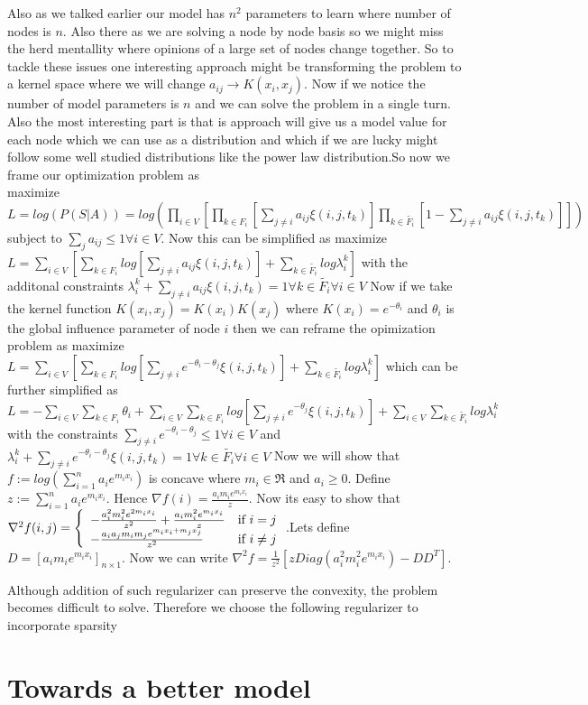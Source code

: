 Also as we talked earlier our model has $n^2$ parameters to learn where number of nodes is $n$. Also there as we are solving a node by node basis so we might miss the herd mentallity where opinions of a large set of nodes change together. So to tackle these issues one interesting approach might be transforming the problem to a kernel space where we will change $a_{ij} \rightarrow K(x_i,x_j)$. Now if we notice the number of model parameters is $n$ and we can solve the problem in a single turn. Also the most interesting part is that is approach will give us a model value for each node which we can use as a distribution and which if we are lucky might follow some well studied distributions like the power law distribution.So now we frame our optimization problem as \\
maximize $L = log(P(S|A)) = log(\displaystyle\prod_{i \in V}[\displaystyle\prod_{k \in F_i}[\displaystyle\sum_{j \neq i} a_{ij}\xi (i,j,t_k)]\displaystyle\prod_{k \in \widetilde{F_{i}}} [1-\displaystyle\sum_{j \neq i}a_{ij}\xi (i,j,t_k)]])$ subject to $\displaystyle\sum_{j} a_{ij} \leq 1 \forall i \in V$. 
Now this can be simplified as maximize $L = \displaystyle\sum_{i \in V}[\displaystyle\sum_{k \in F_i}log[\displaystyle\sum_{j \neq i} a_{ij}\xi (i,j,t_k)]+\displaystyle\sum_{k \in \widetilde{F_{i}}}log\lambda_{i}^{k}]$ with the additonal constraints $\lambda_{i}^{k} + \displaystyle\sum_{j \neq i}a_{ij}\xi (i,j,t_k) = 1 \forall k \in \widetilde{F_{i}} \forall i \in V$
Now if we take the kernel function $K(x_i,x_j) = K(x_i)K(x_j)$ where $K(x_i) = e^{-\theta_i}$ and $\theta_i$ is the global influence parameter of node $i$ then we can reframe the opimization problem as maximize $L = \displaystyle\sum_{i \in V}[\displaystyle\sum_{k \in F_i}log[\displaystyle\sum_{j \neq i} e^{-\theta_i-\theta_j}\xi (i,j,t_k)]+\displaystyle\sum_{k \in \widetilde{F_{i}}}log\lambda_{i}^{k}]$ which can be further simplified as $L = -\displaystyle\sum_{i \in V}\displaystyle\sum_{k \in F_i}\theta_i+\displaystyle\sum_{i \in V}\displaystyle\sum_{k \in F_i}log[\displaystyle\sum_{j \neq i} e^{-\theta_j}\xi (i,j,t_k)]+\displaystyle\sum_{i \in V}\displaystyle\sum_{k \in \widetilde{F_{i}}}log\lambda_{i}^{k}$ with the constraints $\displaystyle\sum_{j \neq i}e^{-\theta_i-\theta_j} \leq 1 \forall i \in V$ and $\lambda_{i}^{k} + \displaystyle\sum_{j \neq i}e^{-\theta_i-\theta_j}\xi(i,j,t_k) = 1 \forall k \in \widetilde{F_i} \forall i\in V$
Now we will show that $f := log(\displaystyle\sum_{i=1}^{n}a_ie^{m_ix_i})$ is concave where $m_i \in \Re$ and $a_i \geq 0$. Define $z := \displaystyle\sum_{i=1}^{n}a_ie^{m_ix_i}$. Hence $\nabla f (i) = \frac{a_im_ie^{m_ix_i}}{z}$. Now its easy to show that $\nabla^2 f(i,j) = \left\{ \begin{array}{ll} -\frac{a_{i}^{2}m_{i}^2e^{2m_ix_i}}{z^2} + \frac{a_im_i^2e^{m_ix_i}}{z} & \mbox{if } i = j \\ -\frac{a_ia_jm_im_je^{m_ix_i+m_jx_j}}{z^2} & \mbox{if } i \neq j \end{array} \right.$.Lets define $D = [a_im_ie^{m_ix_i}]_{n \times 1}$. Now we can write $\nabla^2 f = \frac{1}{z^2}[zDiag(a_i^2m_i^2e^{m_ix_i})-DD^T]$.

Although addition of such regularizer can preserve the convexity, the problem becomes difficult to solve. Therefore we choose the following regularizer to incorporate sparsity 
\section*{Towards a better model}